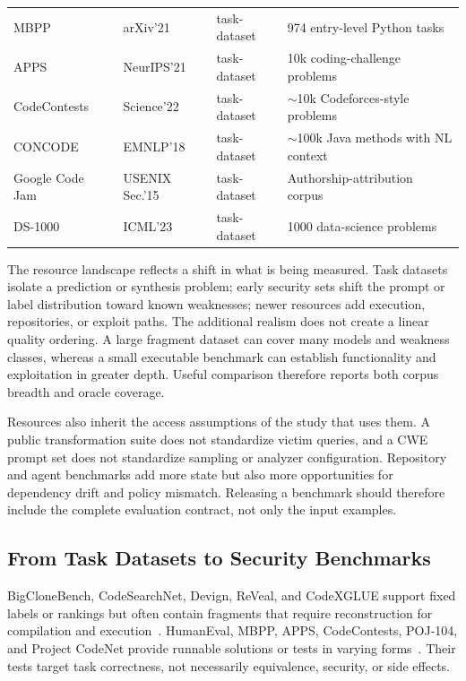 \documentclass[acmsmall,screen,review]{acmart}
\begin{document}
{\begin{longtable}{@{}L{2.65cm} L{1.75cm} L{2.40cm} L{4.85cm}@{}}
MBPP~\cite{austin2021mbpp} & arXiv'21 & task-dataset & 974 entry-level Python tasks \\
APPS~\cite{hendrycks2021apps} & NeurIPS'21 & task-dataset & 10k coding-challenge problems \\
CodeContests~\cite{li2022codecontests} & Science'22 & task-dataset & $\sim$10k Codeforces-style problems \\
CONCODE~\cite{iyer2018concode} & EMNLP'18 & task-dataset & $\sim$100k Java methods with NL context \\
Google Code Jam~\cite{caliskan2015gcj} & USENIX Sec.'15 & task-dataset & Authorship-attribution corpus \\
DS-1000~\cite{lai2023ds1000} & ICML'23 & task-dataset & 1000 data-science problems \\
\end{longtable}
}

The resource landscape reflects a shift in what is being measured. Task datasets isolate a prediction or synthesis problem; early security sets shift the prompt or label distribution toward known weaknesses; newer resources add execution, repositories, or exploit paths. The additional realism does not create a linear quality ordering. A large fragment dataset can cover many models and weakness classes, whereas a small executable benchmark can establish functionality and exploitation in greater depth. Useful comparison therefore reports both corpus breadth and oracle coverage.

Resources also inherit the access assumptions of the study that uses them. A public transformation suite does not standardize victim queries, and a CWE prompt set does not standardize sampling or analyzer configuration. Repository and agent benchmarks add more state but also more opportunities for dependency drift and policy mismatch. Releasing a benchmark should therefore include the complete evaluation contract, not only the input examples.

\subsection{From Task Datasets to Security Benchmarks}
BigCloneBench, CodeSearchNet, Devign, ReVeal, and CodeXGLUE support fixed labels or rankings but often contain fragments that require reconstruction for compilation and execution~\cite{svajlenko2015bigclonebench,husain2019codesearchnet,zhou2019devign,chakraborty2021reveal,lu2021codexglue}. HumanEval, MBPP, APPS, CodeContests, POJ-104, and Project CodeNet provide runnable solutions or tests in varying forms~\cite{chen2021humaneval,austin2021mbpp,hendrycks2021apps,li2022codecontests,mou2016poj,puri2021codenet}. Their tests target task correctness, not necessarily equivalence, security, or side effects.
\end{document}
